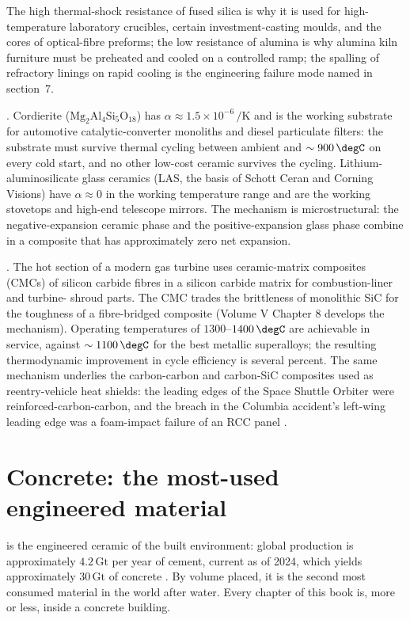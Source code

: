 The high thermal-shock resistance of fused silica is why it is used
for high-temperature laboratory crucibles, certain investment-casting
moulds, and the cores of optical-fibre preforms; the low resistance of
alumina is why alumina kiln furniture must be preheated and cooled on
a controlled ramp; the spalling of refractory linings on rapid cooling
is the engineering failure mode named in section~7.

. Cordierite ($\mathrm{Mg_2Al_4Si_5O_{18}}$) has
$\alpha \approx 1.5 \times 10^{-6}\,\si{\per\kelvin}$ and is the
working substrate for automotive catalytic-converter monoliths and
diesel particulate filters: the substrate must survive thermal
cycling between ambient and $\sim 900\,\degC$ on every cold start, and
no other low-cost ceramic survives the cycling. Lithium-aluminosilicate
glass ceramics (LAS, the basis of Schott Ceran and Corning Visions)
have $\alpha \approx 0$ in the working temperature range and are the
working stovetops and high-end telescope mirrors. The mechanism is
microstructural: the negative-expansion ceramic phase and the
positive-expansion glass phase combine in a composite that has
approximately zero net expansion.

. The hot section of a modern gas
turbine uses ceramic-matrix composites (CMCs) of silicon carbide
fibres in a silicon carbide matrix for combustion-liner and turbine-
shroud parts. The CMC trades the brittleness of monolithic SiC for the
toughness of a fibre-bridged composite (Volume V Chapter 8 develops
the mechanism). Operating temperatures of $1300$--$1400\,\degC$ are
achievable in service, against $\sim 1100\,\degC$ for the best metallic
superalloys; the resulting thermodynamic improvement in cycle
efficiency is several percent. The same mechanism underlies the
carbon-carbon and carbon-SiC composites used as reentry-vehicle heat
shields: the leading edges of the Space Shuttle Orbiter were
reinforced-carbon-carbon, and the breach in the Columbia accident's
left-wing leading edge was a foam-impact failure of an RCC panel
\cite{acc:caib-columbia}.

\section{Concrete: the most-used engineered material}

 is the engineered ceramic of the built environment:
global production is approximately $4.2\,\text{Gt}$ per year of
cement, current as of 2024, which yields approximately $30\,\text{Gt}$
of concrete \cite[ch.~1]{text:neville-concrete}. By volume placed, it
is the second most consumed material in the world after water. Every
chapter of this book is, more or less, inside a concrete building.

